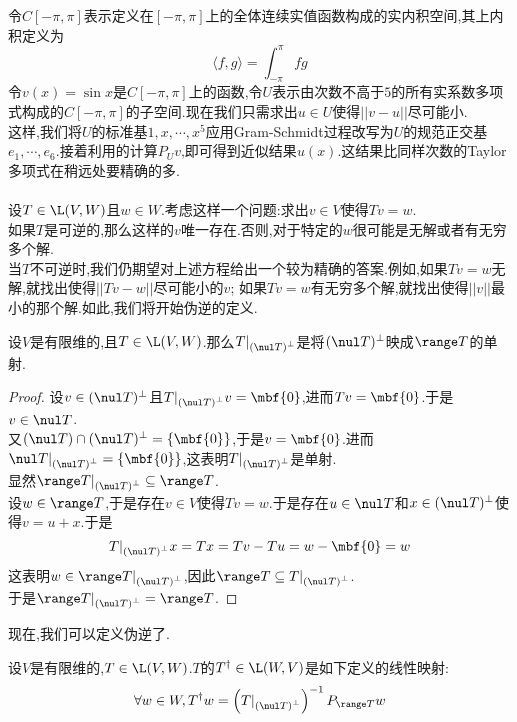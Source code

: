 \documentclass{ctexart}
\begin{document}
令$C[-\pi,\pi]$表示定义在$[-\pi,\pi]$上的全体连续实值函数构成的实内积空间,其上内积定义为
$$\langle f,g\rangle=\int_{-\pi}^\pi fg$$
令$v(x)=\sin x$是$C[-\pi,\pi]$上的函数,令$U$表示由次数不高于$5$的所有实系数多项式构成的$C[-\pi,\pi]$的子空间.现在我们只需求出$u\in U$使得$||v-u||$尽可能小.\\
这样,我们将$U$的标准基$1,x,\cdots,x^5$应用Gram-Schmidt过程改写为$U$的规范正交基$e_1,\cdots,e_6$.接着利用的计算$P_Uv$,即可得到近似结果$u(x)$.这结果比同样次数的Taylor多项式在稍远处要精确的多.\\
\\
设$T\in\L(V,W)$且$w\in W$.考虑这样一个问题:求出$v\in V$使得$Tv=w$.\\
如果$T$是可逆的,那么这样的$v$唯一存在.否则,对于特定的$w$很可能是无解或者有无穷多个解.\\
当$T$不可逆时,我们仍期望对上述方程给出一个较为精确的答案.例如,如果$Tv=w$无解,就找出使得$||Tv-w||$尽可能小的$v$;%
如果$Tv=w$有无穷多个解,就找出使得$||v||$最小的那个解.如此,我们将开始伪逆的定义.
\begin{formal}[3.1 限制线性映射以获得既单又满的映射]
    设$V$是有限维的,且$T\in\L(V,W)$.那么$T|_{\left(\nul T\right)^\bot}$是将$(\nul T)^\bot$映成$\range T$的单射.
\end{formal}
\begin{proof}
    设$v\in(\nul T)^\bot$且$T|_{\left(\nul T\right)^\bot}v=\mbf{0}$,进而$Tv=\mbf{0}$.于是$v\in\nul T$.\\
    又$(\nul T)\cap(\nul T)^\bot=\left\{\mbf{0}\right\}$,于是$v=\mbf{0}$.进而$\nul T|_{\left(\nul T\right)^\bot}=\left\{\mbf{0}\right\}$,这表明$T|_{\left(\nul T\right)^\bot}$是单射.\\
    显然$\range T|_{\left(\nul T\right)^\bot}\subseteq\range T$.\\
    设$w\in\range T$,于是存在$v\in V$使得$Tv=w$.于是存在$u\in\nul T$和$x\in(\nul T)^\bot$使得$v=u+x$.于是
    $$T|_{\left(\nul T\right)^\bot}x=Tx=Tv-Tu=w-\mbf{0}=w$$
    这表明$w\in\range T|_{\left(\nul T\right)^\bot}$,因此$\range T\subseteq T|_{\left(\nul T\right)^\bot}$.\\
    于是$\range T|_{\left(\nul T\right)^\bot}=\range T$.
\end{proof}\noindent
现在,我们可以定义伪逆了.
\begin{definition}[3.2 定义:伪逆]
    设$V$是有限维的,$T\in\L(V,W)$.$T$的$T^\dagger\in\L(W,V)$是如下定义的线性映射:
    $$\forall w\in W,T^\dagger w=\left(T|_{\left(\nul T\right)^\bot}\right)^{-1}P_{\range T}w$$
\end{definition}\noindent
\end{document}
